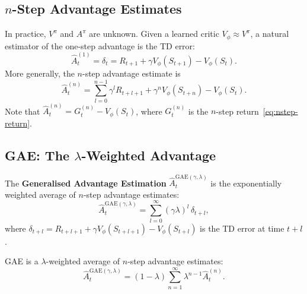 \subsection{$n$-Step Advantage Estimates}

In practice, $V^\pi$ and $A^\pi$ are unknown.  Given a learned critic $V_\phi \approx V^\pi$, a natural estimator of the one-step advantage is the TD error:
\begin{equation}
\label{eq:td-advantage}
\hat A_t^{(1)} = \delta_t = R_{t+1} + \gamma V_\phi(S_{t+1}) - V_\phi(S_t).
\end{equation}
More generally, the $n$-step advantage estimate is
\begin{equation}
\label{eq:nstep-advantage}
\hat A_t^{(n)} = \sum_{l=0}^{n-1}\gamma^l R_{t+l+1} + \gamma^n V_\phi(S_{t+n}) - V_\phi(S_t).
\end{equation}
Note that $\hat A_t^{(n)} = G_t^{(n)} - V_\phi(S_t)$, where $G_t^{(n)}$ is the $n$-step return~\eqref{eq:nstep-return}.

\subsection{GAE: The $\lambda$-Weighted Advantage}

\begin{definition}
\label{def:gae}
The \textbf{Generalised Advantage Estimation} $\hat A_t^{\mathrm{GAE}(\gamma,\lambda)}$ is the exponentially weighted average of $n$-step advantage estimates:
\begin{equation}
\label{eq:gae}
\hat A_t^{\mathrm{GAE}(\gamma,\lambda)} = \sum_{l=0}^{\infty}(\gamma\lambda)^l\,\delta_{t+l},
\end{equation}
where $\delta_{t+l} = R_{t+l+1} + \gamma V_\phi(S_{t+l+1}) - V_\phi(S_{t+l})$ is the TD error at time $t+l$.
\end{definition}

\begin{proposition}
GAE is a $\lambda$-weighted average of $n$-step advantage estimates:
\begin{equation}
\label{eq:gae-lambda-avg}
\hat A_t^{\mathrm{GAE}(\gamma,\lambda)} = (1-\lambda)\sum_{n=1}^{\infty}\lambda^{n-1}\hat A_t^{(n)}.
\end{equation}
\end{proposition}

